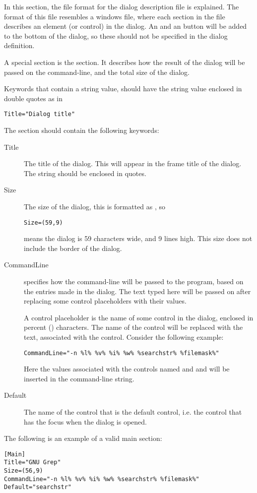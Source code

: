 In this section, the file format for the dialog description file is explained.
The format of this file resembles a windows  file, where each section
in the file describes an element (or control) in the dialog.
An  and an  button will be added to the bottom of the dialog,
so these should not be specified in the dialog definition.

A special section is the  section. It describes how the result of
the dialog will be passed on the command-line, and the total size of the dialog.

\begin{remark}
Keywords that contain a string value, should have the string value enclosed
in double quotes as in
\begin{verbatim}
Title="Dialog title"
\end{verbatim}
\end{remark}

The  section should contain the following keywords:
\begin{description}
\item[Title] The title of the dialog. This will appear in the frame title of the dialog.
The string should be enclosed in quotes.
\item[Size] The size of the dialog, this is formatted as , so
\begin{verbatim}
Size=(59,9)
\end{verbatim}
means the dialog is 59 characters wide, and 9 lines high. This size does not include
the border of the dialog.
\item[CommandLine] specifies how the command-line will be passed to the
program, based on the entries made in the dialog. The text typed here will be passed
on after replacing some control placeholders with their values.

A control placeholder is the name of some control in the dialog, enclosed in
percent (\var{\%}) characters. The name of the control will be replaced with
the text, associated with the control. Consider the following example:
\begin{verbatim}
CommandLine="-n %l% %v% %i% %w% %searchstr% %filemask%"
\end{verbatim}
Here the values associated with the controls named  and
 and  will be inserted in the command-line
string.
\item[Default]
The name of the control that is the default control, i.e. the control
that has the focus when the dialog is opened.
\end{description}
The following is an example of a valid main section:
\begin{verbatim}
[Main]
Title="GNU Grep"
Size=(56,9)
CommandLine="-n %l% %v% %i% %w% %searchstr% %filemask%"
Default="searchstr"
\end{verbatim}

